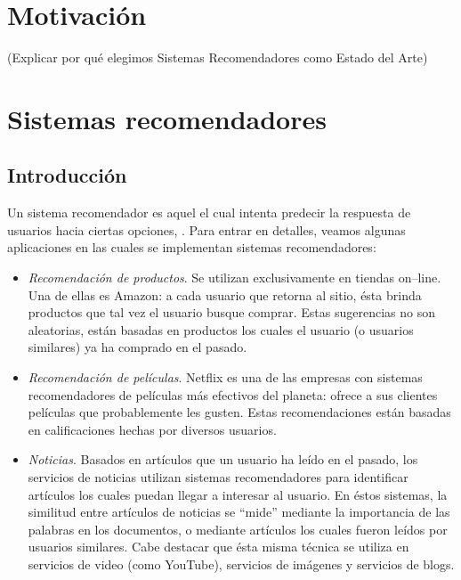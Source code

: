 \section{Motivación}
(Explicar por qué elegimos Sistemas Recomendadores como Estado del Arte)

\section{Sistemas recomendadores}
	
	\subsection{Introducción}
		Un sistema recomendador es aquel el cual intenta predecir la respuesta de usuarios hacia ciertas opciones, \cite{ullman2014}. Para entrar en detalles, veamos algunas aplicaciones en las cuales se implementan sistemas recomendadores:
		\begin{itemize}
			\item \textit{Recomendación de productos}. Se utilizan exclusivamente en tiendas on--line. Una de ellas es Amazon: a cada usuario que retorna al sitio, ésta brinda productos que tal vez el usuario busque comprar. Estas sugerencias no son aleatorias, están basadas en productos los cuales el usuario (o usuarios similares) ya ha comprado en el pasado.
			\item \textit{Recomendación de películas}. Netflix es una de las empresas con sistemas recomendadores de películas más efectivos del planeta: ofrece a sus clientes películas que probablemente les gusten. Estas recomendaciones están basadas en calificaciones hechas por diversos usuarios.
			\item \textit{Noticias}. Basados en artículos que un usuario ha leído en el pasado, los servicios de noticias utilizan sistemas recomendadores para identificar artículos los cuales puedan llegar a interesar al usuario. En éstos sistemas, la similitud entre artículos de noticias se \enquote{mide} mediante la importancia de las palabras en los documentos, o mediante artículos los cuales fueron leídos por usuarios similares. Cabe destacar que ésta misma técnica se utiliza en servicios de video (como YouTube), servicios de imágenes y servicios de blogs.
		\end{itemize}
	

